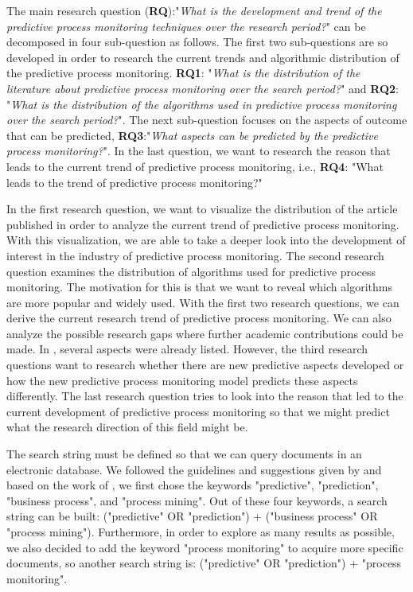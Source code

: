\documentclass[runningheads]{llncs}
\begin{document}
		The main research question (\textbf{RQ}):"\textit{What is the development and trend of the predictive process monitoring techniques over the research period?}" can be decomposed in four sub-question as follows. The first two sub-questions are so developed in order to research the current trends and algorithmic distribution of the predictive process monitoring. \textbf{RQ1}: "\textit{What is the distribution of the literature about predictive process monitoring over the search period?}" and \textbf{RQ2}: "\textit{What is the distribution of the algorithms used in predictive process monitoring over the search period?}". The next sub-question focuses on the aspects of outcome that can be predicted, \textbf{RQ3}:"\textit{What aspects can be predicted by the predictive process monitoring?}". In the last question, we want to research the reason that leads to the current trend of predictive process monitoring, i.e., \textbf{RQ4}: "What leads to the trend of predictive process monitoring?"
		
		In the first research question, we want to visualize the distribution of the article published in order to analyze the current trend of predictive process monitoring. With this visualization, we are able to take a deeper look into the development of interest in the industry of predictive process monitoring. The second research question examines the distribution of algorithms used for predictive process monitoring. The motivation for this is that we want to reveal which algorithms are more popular and widely used. With the first two research questions, we can derive the current research trend of predictive process monitoring. We can also analyze the possible research gaps where further academic contributions could be made. In \cite{ref1}, several aspects were already listed. However, the third research questions want to research whether there are new predictive aspects developed or how the new predictive process monitoring model predicts these aspects differently. The last research question tries to look into the reason that led to the current development of predictive process monitoring so that we might predict what the research direction of this field might be.
		
		The search string must be defined so that we can query documents in an electronic database. We followed the guidelines and suggestions given by \cite{ref2} and based on the work of \cite{ref1}, we first chose the keywords "predictive", "prediction", "business process", and "process mining". Out of these four keywords, a search string can be built: ("predictive" OR "prediction") + ("business process" OR "process mining"). Furthermore, in order to explore as many results as possible, we also decided to add the keyword "process monitoring" to acquire more specific documents, so another search string is: ("predictive" OR "prediction") + "process monitoring". 
		
\end{document}
